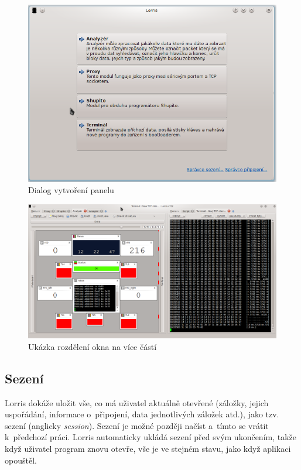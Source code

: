 \documentclass[12pt, a4paper, oneside]{article}
\newcommand{\It}{\textit}  %
\begin{document}
\begin{figure}[H]
\begin{center}
\includegraphics[scale=0.6]{img/new_tab.png}
\caption{Dialog vytvoření panelu}
\end{center}
\end{figure}

\begin{figure}[H]
\begin{center}
\includegraphics[width=\textwidth]{img/split.png}
\caption{Ukázka rozdělení okna na více částí}
\label{split_img}
\end{center}
\end{figure}

\enlargethispage{60mm} %
\setlength{\voffset}{-20mm}
\addtolength{\textheight}{20mm}
\newpage
\subsection{Sezení}
Lorris dokáže uložit vše, co má uživatel aktuálně otevřené (záložky, jejich uspořádání, informace o~připojení, data jednotlivých záložek atd.), jako tzv. sezení (anglicky \It{session}). Sezení je možné později načíst a~tímto se vrátit k~předchozí práci. Lorris automaticky ukládá sezení před svým ukončením, takže když uživatel program znovu otevře, vše je ve stejném stavu, jako když aplikaci opouštěl.
\end{document}
